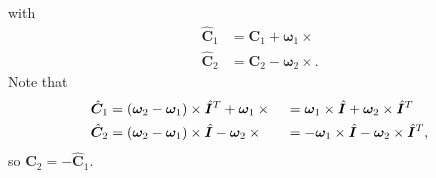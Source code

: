 \documentclass[10pt,fleqn,subeqn]{report}
\newcommand{\T}[1]{\bm{#1}}
\newcommand{\TT}[1]{\bm{#1}}
\begin{document}
with
\begin{subequations}
\begin{align}
	\hat{\TT{C}}_1 &= \TT{C}_1 + \T{\omega}_1\times{}
	\\
	\hat{\TT{C}}_2 &= \TT{C}_2 - \T{\omega}_2\times{}
	.
\end{align}
\end{subequations}
Note that
\begin{subequations}
\begin{align}
	\hat{\TT{C}}_1
	&= \plbr{\T{\omega}_2 - \T{\omega}_1}\times\hat{\TT{I}}^T
	+ \T{\omega}_1\times{}
	&&= \T{\omega}_1 \times\hat{\TT{I}}
		+ \T{\omega}_2 \times\hat{\TT{I}}^T
	\\
	\hat{\TT{C}}_2
	&= \plbr{\T{\omega}_2 - \T{\omega}_1}\times\hat{\TT{I}}
	- \T{\omega}_2\times{}
	&&= - \T{\omega}_1 \times\hat{\TT{I}}
		- \T{\omega}_2 \times\hat{\TT{I}}^T
	,
\end{align}
\end{subequations}
so $\hat{\TT{C}}_2 = - \hat{\TT{C}}_1$.
\end{document}
